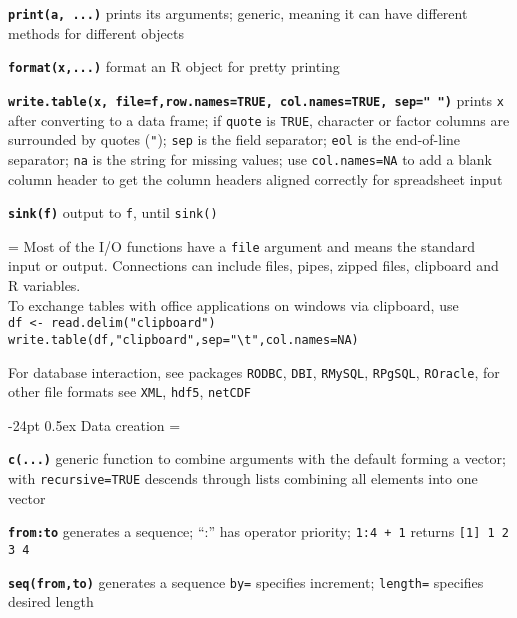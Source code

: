 \documentclass[8pt,landscape]{article}
\makeatletter
\renewcommand\section{\@startsection{section}{1}{0mm}%
                                     {-24pt}%
                                     {0.5ex}%
                                {\color{blue}\normalfont\large\bfseries}}
\newcommand{\code}{\texttt}
\newcommand{\bcode}[1]{\texttt{\textbf{#1}}}
\makeatother
\begin{document}
\begin{multicols*}{3}
\bcode{print(a, ...)} prints its arguments; generic, meaning it can
have different methods for different objects

\bcode{format(x,...)} format an R object for pretty printing

\bcode{write.table(x, file=f,row.names=TRUE, col.names=TRUE, sep=" ")} 
prints \code{x} after converting to a data frame; if \code{quote} is
                 \code{TRUE}, character or factor columns are
                 surrounded by quotes (\code{"}); \code{sep} is the field
                 separator; \code{eol} is the end-of-line separator;
                 \code{na} is the string for missing values; use
                 \code{col.names=NA} to add a blank column header to
                 get the column headers aligned correctly for
                 spreadsheet input

\bcode{sink(f)} output to \code{f}, until \code{sink()}

\everypar={\hangindent=0mm}
Most of the I/O functions have a \code{file} argument and 
means the standard input or output. Connections can include files, pipes, zipped
files, clipboard and R variables.\\ 

To exchange tables with office applications on windows via clipboard, use \\
\code{df <- read.delim("clipboard")}\\
\code{write.table(df,"clipboard",sep="\textbackslash t",col.names=NA)}

For database interaction, see packages \code{RODBC}, \code{DBI},
\code{RMySQL}, \code{RPgSQL}, \code{ROracle}, for other file formats see
\code{XML}, \code{hdf5}, \code{netCDF} 




\section{Data creation}
\everypar={\hangindent=9mm}

\bcode{c(...)} generic function to combine arguments with the default
forming a vector;
with \code{recursive=TRUE} descends through lists combining all elements
into one vector

\bcode{from:to} generates a sequence; ``:'' has operator priority; \code{1:4
+ 1} returns \code{[1] 1 2 3 4}

\bcode{seq(from,to)} generates a sequence
\code{by=} specifies increment; \code{length=} specifies desired length


\end{multicols*}
\end{document}
